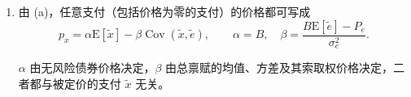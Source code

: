 \begin{solution}[label-content={证明},blank-type=manual,blank-vsep=9\baselineskip]
\begin{enumerate}[label=(\alph*)]
若该仿射关系在一个消费区间内处处成立，则 $u'(e)=A-De$，积分得 $u(e)=Ae-De^2/2+C$，严格凹性对应 $D>0$。这给出(a)中二次效用的区间刻画。有限状态只确定 $u'(e_\omega)$ 在若干点的取值；这些点之间仍可作不同的递减插值。例如， 中的两状态模型允许对数效用。

\item 由 (a)，任意支付（包括价格为零的支付）的价格都可写成
\[
 \boxed{p_x=\alpha\mathrm E[\widetilde x]-\beta\operatorname{Cov}(\widetilde x,\widetilde e)},\qquad
 \alpha=B,\quad\beta=\frac{B\mathrm E[\widetilde e]-P_e}{\sigma_e^2}.
\]

$\alpha$ 由无风险债券价格决定，$\beta$ 由总禀赋的均值、方差及其索取权价格决定，二者都与被定价的支付 $\widetilde x$ 无关。\qedhere
\end{enumerate}
\end{solution}

